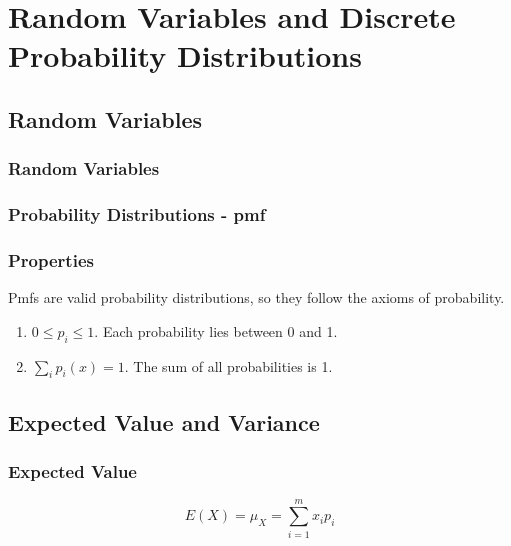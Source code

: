 \chapter{Random Variables and Discrete Probability Distributions}  %

\section{Random Variables}  %
\subsection{Random Variables}  %

\subsection{Probability Distributions - pmf}  %

\subsection{Properties}  %
Pmfs are valid probability distributions, so they follow the axioms of probability.
\begin{enumerate}
    \item $0\leq p_i\leq 1$. Each probability lies between 0 and 1.
    \item $\sum_i p_i(x)=1$. The sum of all probabilities is 1.
\end{enumerate}

\section{Expected Value and Variance}  %

\subsection{Expected Value}  %
\begin{equation} E(X)=\mu_X=\sum^m_{i=1} x_ip_i \end{equation}

